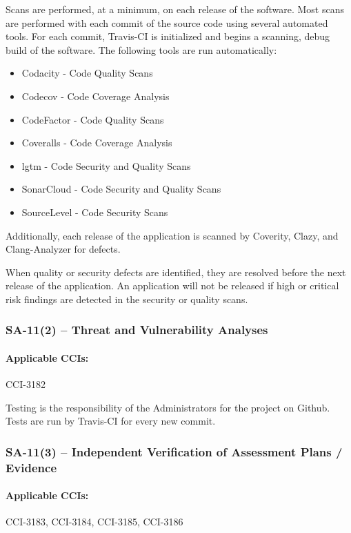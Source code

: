 \documentclass[letterpaper, 10pt, twoside]{article}
\begin{document}
Scans are performed, at a minimum, on each release of the software. Most scans are performed with each commit of the source code using several automated tools. For each commit, Travis-CI is initialized and begins a scanning, debug build of the software. The following tools are run automatically:
\begin{itemize}
	\item Codacity - Code Quality Scans
	\item Codecov - Code Coverage Analysis
	\item CodeFactor - Code Quality Scans
	\item Coveralls - Code Coverage Analysis
	\item lgtm - Code Security and Quality Scans
	\item SonarCloud - Code Security and Quality Scans
	\item SourceLevel - Code Security Scans
\end{itemize}

Additionally, each release of the application is scanned by Coverity, Clazy, and Clang-Analyzer for defects.

When quality or security defects are identified, they are resolved before the next release of the application. An application will not be released if high or critical risk findings are detected in the security or quality scans.

\subsubsection{SA-11(2) -- Threat and Vulnerability Analyses}

\paragraph{Applicable CCIs:} CCI-3182

Testing is the responsibility of the Administrators for the project on Github. Tests are run by Travis-CI for every new commit.

\subsubsection{SA-11(3) -- Independent Verification of Assessment Plans / Evidence}

\paragraph{Applicable CCIs:} CCI-3183, CCI-3184, CCI-3185, CCI-3186
\end{document}
